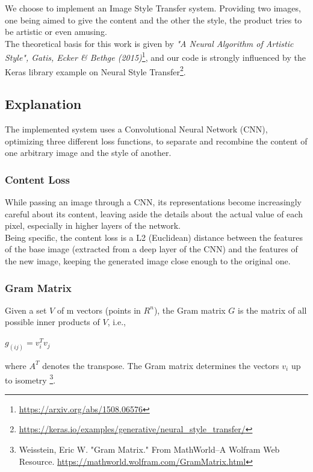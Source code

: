 We choose to implement an Image Style Transfer system.
Providing two images, one being aimed to give the content and the other the style, the product tries to be artistic or even amusing.\\
The theoretical basis for this work is given by \emph{"A Neural Algorithm of Artistic Style", Gatis, Ecker \& Bethge (2015)}\footnote{\href{https://arxiv.org/abs/1508.06576}{https://arxiv.org/abs/1508.06576}},
and our code is strongly influenced by the Keras library example on Neural Style Transfer\footnote{\href{https://keras.io/examples/generative/neural\_style\_transfer/}{https://keras.io/examples/generative/neural\_style\_transfer/}}.

\subsection{Explanation}
The implemented system uses a Convolutional Neural Network (CNN), optimizing three different loss functions, to separate and recombine the content of one arbitrary image and the style of another.\\
\subsubsection{Content Loss}
While passing an image through a CNN, its representations become increasingly careful about its content,
leaving aside the details about the actual value of each pixel, especially in higher layers of the network.\\
Being specific, the content loss is a L2 (Euclidean) distance between the features of the base image (extracted from a deep layer of the CNN) and the features of the new image, keeping the generated image close enough to the original one.

\subsubsection{Gram Matrix}
Given a set $V$ of m vectors (points in $R^n$), the Gram matrix $G$ is the matrix of all possible inner products of $V$, i.e.,
\begin{center}
    \(
     g_(ij)=v_i^Tv_j 
    \)
\end{center}
where \(A^T\) denotes the transpose.
The Gram matrix determines the vectors $v_i$ up to isometry
\footnote{Weisstein, Eric W. "Gram Matrix." From MathWorld--A Wolfram Web Resource. \href{https://mathworld.wolfram.com/GramMatrix.html}{https://mathworld.wolfram.com/GramMatrix.html}}.

